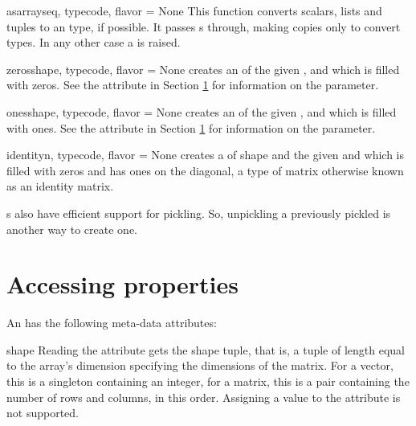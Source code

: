 \begin{funcdesc}{asarray}{seq, typecode, flavor = None}
  This function converts scalars, lists and tuples to an
   type, if possible. It passes s through,
  making copies only to convert types.  In any other case a
   is raised.
\end{funcdesc}

\begin{funcdesc}{zeros}{shape, typecode, flavor = None}
   creates an  of the given ,
   and  which is filled with zeros. See the
   attribute in Section \ref{sec:arrayproperties} for
  information on the  parameter.
\end{funcdesc}

\begin{funcdesc}{ones}{shape, typecode, flavor = None}
   creates an  of the given ,
   and  which is filled with ones. See the
   attribute in Section \ref{sec:arrayproperties} for
  information on the  parameter.
\end{funcdesc}

\begin{funcdesc}{identity}{n, typecode, flavor = None}
   creates a  of shape  and
  the given  and  which is filled with
  zeros and has ones on the diagonal, a type of matrix otherwise
  known as an identity matrix.
\end{funcdesc}

s also have efficient support for pickling. So, unpickling
a previously pickled  is another way to create one.

\section{Accessing  properties}

\label{sec:arrayproperties}
An  has the following meta-data attributes:

\begin{memberdesc}[Array]{shape}
  Reading the  attribute gets the shape tuple, that is,
  a tuple of length equal to the array's dimension specifying the
  dimensions of the matrix.  For a vector, this is a singleton
  containing an integer, for a matrix, this is a pair containing the
  number of rows and columns, in this order.  Assigning a value to the
   attribute is not supported.
\end{memberdesc}

